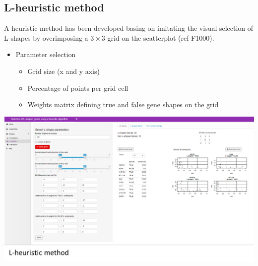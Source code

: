 \subsection{L-heuristic method}
A heuristic method has been developed basing on imitating the visual selection of L-shapes by overimposing a $3\times 3$ grid on the scatterplot (ref F1000).

\begin{itemize}
\item Parameter selection
\begin{itemize}
	\item Grid size (x and y axis)
	\item Percentage of points per grid cell
	\item Weights matrix defining true and false gene shapes on the grid
\end{itemize}
\end{itemize}

\begin{center}
	\includegraphics[width=0.8\columnwidth]{./images/Lheuristic_method.png}
\end{center}
